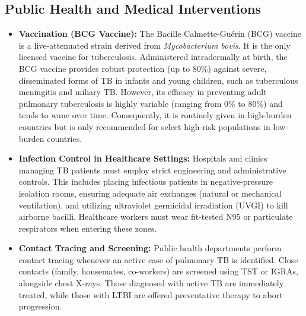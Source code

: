 \subsection*{Public Health and Medical Interventions}
\begin{itemize}
    \item \textbf{Vaccination (BCG Vaccine):} The Bacille Calmette-Gu\'{e}rin (BCG) vaccine is a live-attenuated strain derived from \textit{Mycobacterium bovis}. It is the only licensed vaccine for tuberculosis. Administered intradermally at birth, the BCG vaccine provides robust protection (up to 80\%) against severe, disseminated forms of TB in infants and young children, such as tuberculous meningitis and miliary TB. However, its efficacy in preventing adult pulmonary tuberculosis is highly variable (ranging from 0\% to 80\%) and tends to wane over time. Consequently, it is routinely given in high-burden countries but is only recommended for select high-risk populations in low-burden countries.
    \item \textbf{Infection Control in Healthcare Settings:} Hospitals and clinics managing TB patients must employ strict engineering and administrative controls. This includes placing infectious patients in negative-pressure isolation rooms, ensuring adequate air exchanges (natural or mechanical ventilation), and utilizing ultraviolet germicidal irradiation (UVGI) to kill airborne bacilli. Healthcare workers must wear fit-tested N95 or particulate respirators when entering these zones.
    \item \textbf{Contact Tracing and Screening:} Public health departments perform contact tracing whenever an active case of pulmonary TB is identified. Close contacts (family, housemates, co-workers) are screened using TST or IGRAs, alongside chest X-rays. Those diagnosed with active TB are immediately treated, while those with LTBI are offered preventative therapy to abort progression.
\end{itemize}

